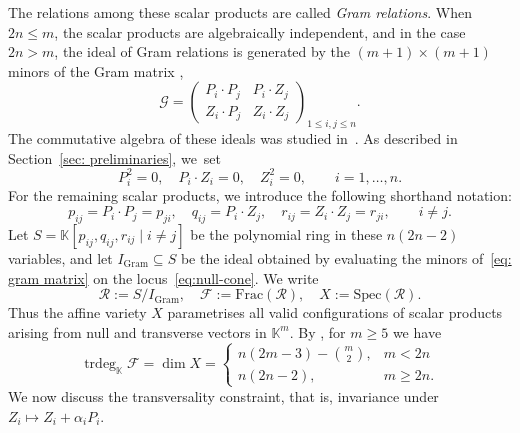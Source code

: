 \documentclass[12pt,a4paper]{extarticle}
\theoremstyle{definition}
\newcommand{\K}{\mathbb{K}}
\begin{document}
\medskip

The relations among these scalar products are called \emph{Gram relations}.
When
$2n\leq m$, the scalar products are algebraically independent, and in the case $2n>m$, the
ideal of Gram relations is generated by the $(m+1)\times(m+1)$ minors of the Gram
matrix \cite[p.~75]{Weyl},
\begin{equation}\label{eq: gram matrix}
\mathcal{G}
=
\begin{pmatrix}
P_i\cdot P_j & P_i\cdot Z_j\\
Z_i\cdot P_j & Z_i\cdot Z_j
\end{pmatrix}_{1\leq i,j\leq n}.
\end{equation}
The commutative algebra of these ideals was studied in~\cite{MSS}.
As described in Section~\ref{sec: preliminaries}, we~set
\begin{equation}\label{eq:null-cone}
    P_i^2=0,\quad P_i\cdot Z_i=0,\quad Z_i^2=0,
    \qquad i=1,\ldots,n.
\end{equation}
For the remaining scalar products, we introduce the following shorthand notation:
$$
    p_{ij}=P_i\cdot P_j=p_{ji},\quad
    q_{ij}=P_i\cdot Z_j,\quad
    r_{ij}=Z_i\cdot Z_j=r_{ji},
    \qquad i\neq j.
$$
Let
$
    S=\K[p_{ij},q_{ij},r_{ij}\mid i\neq j]
$ be the polynomial ring in these $n(2n - 2)$ variables,
and let $I_{\mathrm{Gram}}\subseteq S$ be the ideal obtained by evaluating the minors of~\eqref{eq: gram matrix} on the locus~\eqref{eq:null-cone}. We
write
\begin{equation}\label{eq:R-def}
    \mathcal{R}:=S/I_{\mathrm{Gram}},
    \quad
    \mathcal{F}:=\mathrm{Frac}(\mathcal{R}),
    \quad
    X:=\mathrm{Spec}(\mathcal{R}).
\end{equation}
Thus the affine variety $X$ parametrises all valid configurations of scalar products arising from null and transverse vectors in $\K^m$. 
By \cite[Theorem~2.5]{MSS}, for $m\geq 5$ we have
\begin{equation}\label{eq: trdegF}
\operatorname{trdeg}_{\K}\mathcal{F}
=
\dim X
=
\begin{cases}
n(2m-3)-\binom{m}{2}, & m<2n\\
n(2n-2), & m\geq 2n.
\end{cases}
\end{equation}
We now discuss the transversality constraint, that is, invariance under $Z_i \mapsto Z_i + \alpha_i P_i$.
\end{document}
